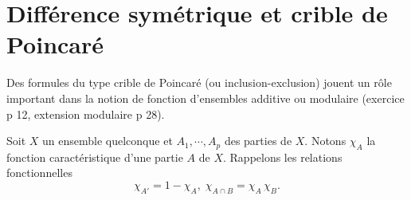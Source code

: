 \section{Différence symétrique et crible de Poincaré}\label{Sec:criblePoinc}
Des formules du type crible de Poincaré (ou inclusion-exclusion) jouent un rôle important dans la notion de fonction d'ensembles additive ou modulaire (exercice p 12, extension modulaire p 28).

\noindent Soit $X$ un ensemble quelconque et $A_1, \cdots, A_p$ des parties de $X$. Notons $\chi_A$ la fonction caractéristique d'une partie $A$ de $X$. Rappelons les relations fonctionnelles
\begin{displaymath}
  \chi_{A'} = 1 - \chi_A, \; \chi_{A \cap B} = \chi_A \, \chi_B.
\end{displaymath}


